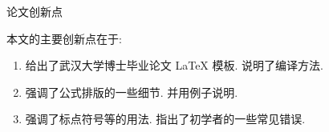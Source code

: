 
\newpage\vspace*{20pt}\thispagestyle{empty}
\begin{center}{\heiti 论文创新点}\end{center}
\par\vspace*{30pt}
\baselineskip=20pt


  本文的主要创新点在于:

\begin{enumerate}[(1)]
  \item  给出了武汉大学博士毕业论文 \LaTeX{} 模板. 说明了编译方法.

  \item  强调了公式排版的一些细节. 并用例子说明.

  \item  强调了标点符号等的用法. 指出了初学者的一些常见错误.


\end{enumerate}

















  \iflib
  \let\cleardoublepage\clearpage
  \else
  \newpage
  \thispagestyle{empty}
  \cleardoublepage
  \fi



